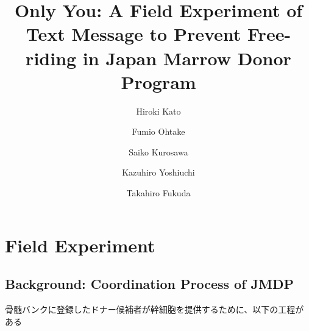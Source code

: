 \documentclass[
  a4paperpaper,
]{article}
\title{Only You: A Field Experiment of Text Message to Prevent
Free-riding in Japan Marrow Donor Program}
\author{Hiroki Kato \and Fumio Ohtake \and Saiko Kurosawa \and Kazuhiro
Yoshiuchi \and Takahiro Fukuda}
\date{}
\begin{document}
\maketitle
\ifdefined\Shaded\renewenvironment{Shaded}{\begin{tcolorbox}[breakable, interior hidden, borderline west={3pt}{0pt}{shadecolor}, sharp corners, boxrule=0pt, enhanced, frame hidden]}{\end{tcolorbox}}\fi

\hypertarget{field-experiment}{%
\section{Field Experiment}\label{field-experiment}}

\hypertarget{background-coordination-process-of-jmdp}{%
\subsection{Background: Coordination Process of
JMDP}\label{background-coordination-process-of-jmdp}}

骨髄バンクに登録したドナー候補者が幹細胞を提供するために、以下の工程がある
\end{document}
